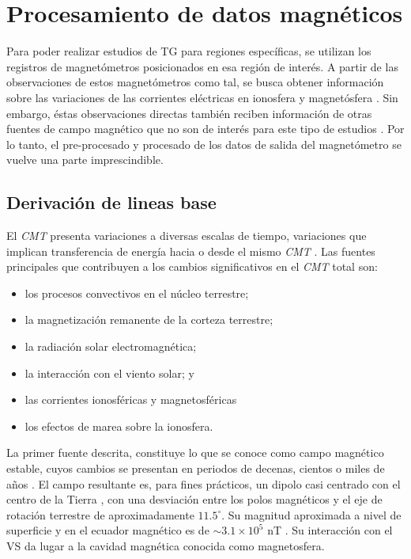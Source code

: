 \section{Procesamiento de datos magnéticos}

Para poder realizar estudios de TG para regiones específicas, se utilizan los registros de magnetómetros posicionados en esa región de interés. A partir de las observaciones de estos magnetómetros como tal, se busca obtener información sobre las variaciones de las corrientes eléctricas en ionosfera y magnetósfera \parencite{BARTELS_kp}. Sin embargo, éstas observaciones directas también reciben información de otras fuentes de campo magnético que no son de interés para este tipo de estudios \parencite{amorymazaudier_2017, amory2020_filtros}. Por lo tanto, el pre-procesado y procesado de los datos de salida del magnetómetro se vuelve una parte imprescindible.
\vspace{1 em}

\subsection{Derivación de lineas base}

El \emph{CMT} presenta variaciones a diversas escalas de tiempo, variaciones que implican transferencia de energía hacia o desde el mismo \emph{CMT} \parencite{l_handbook_geof_sw_Geom_field}. Las fuentes principales que contribuyen a los cambios significativos en el \emph{CMT} total son:
\begin{itemize}
    \item los procesos convectivos en el núcleo terrestre;
    \item la magnetización remanente de la corteza terrestre;
    \item la radiación solar electromagnética;
    \item la interacción con el viento solar; y
    \item las corrientes ionosféricas y magnetosféricas
    \item los efectos de marea sobre la ionosfera.    
\end{itemize}

La primer fuente descrita, constituye lo que se conoce como campo magnético estable, cuyos cambios se presentan en periodos de decenas, cientos o miles de años \parencite{l_handbook_geof_sw_Geom_field}. El campo resultante es, para fines prácticos, un dipolo casi centrado con el centro de la Tierra \parencite{hargreaves_1992}, con una desviación entre los polos magnéticos y el eje de rotación terrestre de aproximadamente $11.5^\circ$. Su magnitud aproximada a nivel de superficie y en el ecuador magnético es de $\sim 3.1 \times 10^{5}$ nT \parencite{l_handbook_geof_sw_Geom_field, l_basic_spaceplasmaphysic, l_russell}. Su interacción con el VS da lugar a la cavidad magnética conocida como magnetosfera.\\
\vspace{1 em}

